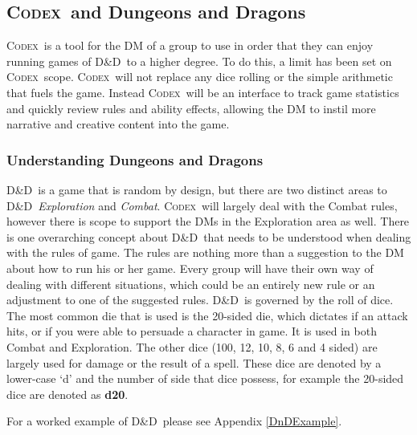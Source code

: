 \documentclass[review]{cmpreport}
\newcommand{\dnd}{D\&D}
\newcommand{\Codex}{\textsc{Codex}}
\begin{document}
	\subsection{\Codex \ and Dungeons and Dragons} \label{DnDRules&Lit}
	\Codex \ is a tool for the DM of a group to use in order that they can enjoy running games of \dnd \ to a higher degree. To do this, a limit has been set on \Codex \ scope. \Codex \ will not replace any dice rolling or the simple arithmetic that fuels the game. Instead \Codex \ will be an interface to track game statistics and quickly review rules and ability effects,  allowing the DM to instil more narrative and creative content into the game.
	
	\subsubsection{Understanding Dungeons and Dragons}
	\dnd \ is a game that is random by design, but there are two distinct areas to \dnd \, \emph{Exploration} and \emph{Combat}. \Codex \ will largely deal with the Combat rules, however there is scope to support the DMs in the Exploration area as well. There is one overarching concept about \dnd \ that needs to be understood when dealing with the rules of game. The rules are nothing more than a suggestion to the DM about how to run his or her game. Every group will have their own way of dealing with different situations, which could be an entirely new rule or an adjustment to one of the suggested rules. \dnd \ is governed by the roll of dice. The most common die that is used is the 20-sided die, which dictates if an attack hits, or if you were able to persuade a character in game. It is used in both Combat and Exploration. The other dice (100, 12, 10, 8, 6 and 4 sided) are largely used for damage or the result of a spell. These dice are denoted by a lower-case `d' and the number of side that dice possess, for example the 20-sided dice are denoted as \textbf{d20}.
	
	For a worked example of \dnd \ please see Appendix \ref{DnDExample}.
	
\end{document}
